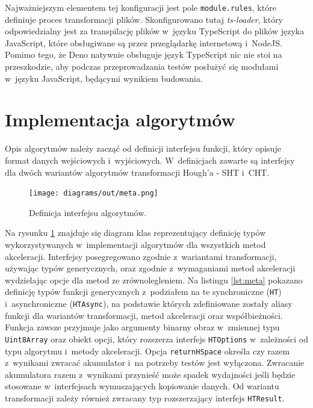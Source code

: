 Najważniejszym elementem tej konfiguracji jest pole \lstinline{module.rules}, które definiuje proces transformacji plików. Skonfigurowano tutaj \textit{ts-loader}, który odpowiedzialny jest za transpilację plików w~języku TypeScript do plików języka JavaScript, które obsługiwane są przez przeglądarkę internetową i~NodeJS. Pomimo tego, że Deno natywnie obsługuje język TypeScript nic nie stoi na przeszkodzie, aby podczas przeprowadzania testów posłużyć się modułami w~języku JavaScript, będącymi wynikiem budowania.

\section{Implementacja algorytmów}

Opis algorytmów należy zacząć od definicji interfejsu funkcji, który opisuje format danych wejściowych i~wyjściowych. W~definicjach zawarte są interfejsy dla dwóch wariantów algorytmów transformacji Hough'a - SHT i~CHT. 

\begin{figure}[h]
  \centering
  \texttt{[image: diagrams/out/meta.png]}
  \caption{Definicja interfejsu algorytmów.}
  \label{fig:meta}
\end{figure}

Na rysunku \ref{fig:meta} znajduje się diagram klas reprezentujący definicję typów wykorzystywanych w~implementacji algorytmów dla wszystkich metod akceleracji. Interfejsy posegregowano zgodnie z~wariantami transformacji, używając typów generycznych, oraz zgodnie z~wymaganiami metod akceleracji wydzielając opcje dla metod ze zrównolegleniem. Na listingu \ref{lst:meta} pokazano definicję typów funkcji generycznych z~podziałem na te synchroniczne (\lstinline{HT}) i~asynchroniczne (\lstinline{HTAsync}), na podstawie których zdefiniowane zostały aliasy funkcji dla wariantów transformacji, metod akceleracji oraz współbieżności. Funkcja zawsze przyjmuje jako argumenty binarny obraz w~zmiennej typu \lstinline{Uint8Array} oraz obiekt opcji, który rozszerza interfejs \lstinline{HTOptions} w~zależności od typu algorytmu i~metody akceleracji. Opcja \lstinline{returnHSpace} określa czy razem z~wynikami zwracać akumulator i~na potrzeby testów jest wyłączona. Zwracanie akumulatora razem z~wynikami przynieść może spadek wydajności jeśli będzie stosowane w~interfejsach wymuszających kopiowanie danych. Od wariantu transformacji zależy również zwracany typ rozszerzający interfejs \lstinline{HTResult}.


